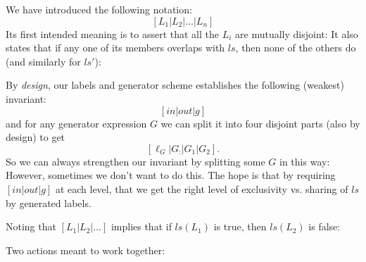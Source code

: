 \newpage
{}

We have introduced the following notation:
\[
  [ L_1 | L_2 | \dots | L_n ]
\]
Its first intended meaning is to assert that
all the $L_i$ are mutually disjoint:
It also states that if any one of its members overlaps with $ls$,
then none of the others do (and similarly for $ls'$):

By \emph{design}, our labels and generator scheme
establishes the following (weakest) invariant:
\[ [in|out|g]\]
and for any generator expression $G$ we can split it into
four disjoint parts (also by design) to get
\[  [\ell_G|G_{:}|G_1|G_2] . \]
So we can always strengthen our invariant by splitting some $G$
in this way:
However, sometimes we don't want to do this.
The hope is that by requiring $[in|out|g]$ at each level,
that we get the right level of exclusivity vs. sharing of $ls$
by generated labels.


Noting that $[L_1|L_2|\dots]$ implies that if $ls(L_1)$ is true,
then $ls(L_2)$ is false:


Two actions meant to work together:

